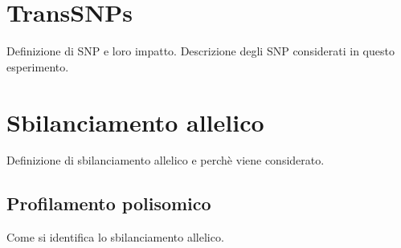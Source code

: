 \section{TransSNPs}
\label{sec:transsnps}
Definizione di SNP e loro impatto.
Descrizione degli SNP considerati in questo esperimento.

\section{Sbilanciamento allelico}
\label{sec:allelicimbalance}
Definizione di sbilanciamento allelico e perch\`e viene considerato.

	\subsection{Profilamento polisomico}
	\label{subsec:polysomalprofiling}
	Come si identifica lo sbilanciamento allelico.
